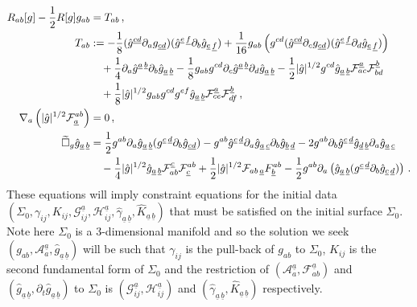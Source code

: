 \documentclass[11pt, a4paper]{amsart}
\numberwithin{equation}{section}
\numberwithin{theorem}{section}
\newcommand{\p}{\partial}
\newcommand{\A}{\mathcal{A}}
\newcommand{\abar}{{\underline{a}}}
\newcommand{\bbar}{{\underline{b}}}
\newcommand{\cbar}{{\underline{c}}}
\newcommand{\dbar}{{\underline{d}}}
\newcommand{\abbar}{{\underline{a} \, \underline{b}}}
\newcommand{\tbox}{\widetilde{\Box}}
\begin{document}
\begin{subequations}
\begin{align}
R_{ab}[g] - \frac{1}{2} R[g] g_{ab} &= T_{ab} \,,\notag \\
T_{ab} &:= - \frac{1}{8} (\hat{g}^{\cbar \dbar} \p_a g_{\cbar \dbar} ) ( \hat{g}^{\underline{e} \, \underline{f}} \p_b \hat{g}_{\underline{e} \, \underline{f}}) + \frac{1}{16} g_{ab} \left( g^{cd} (\hat{g}^{\cbar \dbar} \p_c g_{\cbar \dbar} ) ( \hat{g}^{\underline{e} \, \underline{f}} \p_d \hat{g}_{\underline{e} \, \underline{f}})\right) \label{eq:ems-eq-g}\\
& \quad + \frac{1}{4} \p_a \hat{g}^\abbar \p_b \hat{g}_\abbar - \frac{1}{8} g_{ab} g^{cd} \p_c \hat{g}^\abbar \p_d \hat{g}_\abbar - \frac{1}{2} \vert \hat{g} \vert^{1/2} g^{cd} \hat{g}_\abbar \mathcal{F}^\abar_{ac} \mathcal{F}^\bbar_{bd} \notag \\
& \quad + \frac{1}{8} \vert \hat{g} \vert^{1/2} g_{ab} g^{cd} g^{ef} \hat{g}_\abbar \mathcal{F}^\abar_{ce} \mathcal{F}^\bbar_{df} \,, \notag \\
\nabla_a \left( \vert \hat{g} \vert^{1/2} \mathcal{F}^{ab}_\abar \right) &= 0 \,, \\
\tbox_g \hat{g}_\abbar &= \frac{1}{2} g^{ab} \p_a \hat{g}_\abbar ( g^{\cbar \, \dbar} \p_b \hat{g}_{\cbar \dbar} )- g^{ab} \hat{g}^{\cbar \, \dbar} \p_a \hat{g}_{\abar \,\cbar} \p_b \hat{g}_{\bbar \,\dbar}- 2 g^{ab} \p_b \hat{g}^{\cbar \, \dbar} \hat{g}_{\dbar \, \bbar} \p_a \hat{g}_{\abar \, \cbar} \\
& \quad - \frac{1}{4} \vert \hat{g} \vert^{1/2} \hat{g}_\abbar \mathcal{F}^\cbar_{ab} \mathcal{F}^{ab}_\cbar + \frac{1}{2} \vert \hat{g} \vert^{1/2} \mathcal{F}_{ab \, \abar} F^{ab}_\bbar - \frac{1}{2} g^{ab} \p_a \left( \hat{g}_\abbar (g^{\cbar \, \dbar} \p_b \hat{g}_{\cbar \, \dbar}) \right) \notag \,.
\end{align} \label{eq:ems-eom}
\end{subequations}
These equations will imply constraint equations for the initial data $(\Sigma_0, \gamma_{ij}, K_{ij}, \mathcal{G}^\abar_{ij}, \mathcal{H}^\abar_{ij}, \hat{\gamma}_\abbar, \hat{K}_\abbar)$ that must be satisfied on the initial surface $\Sigma_0$. Note here $\Sigma_0$ is a 3-dimensional manifold and so the solution we seek $(g_{ab}, \A_a^\abar, \hat{g}_\abbar )$ will be such that $\gamma_{ij}$ is the pull-back of $g_{ab}$ to $\Sigma_0$, $K_{ij}$ is the second fundamental form of $\Sigma_0$ and the restriction of $(\A_a^\abar, \mathcal{F}_{ab}^\abar)$ and $(\hat{g}_\abbar, \p_t \hat{g}_\abbar)$ to $\Sigma_0$ is $(\mathcal{G}^\abar_{ij}, \mathcal{H}^\abar_{ij})$ and $(\hat{\gamma}_\abbar, \hat{K}_\abbar)$ respectively. 
\end{document}
